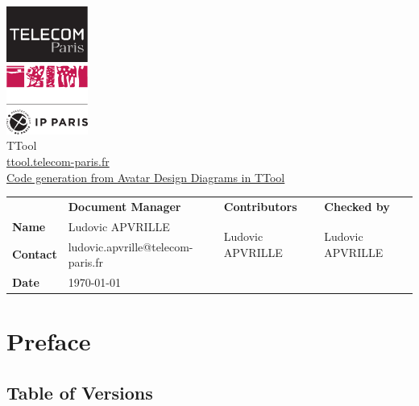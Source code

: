 \documentclass[12pt]{article}
\begin{document}
\sloppy 

\begin{center}

\includegraphics[width=0.2\textwidth]{figures/tp}
\vspace{10 pt}\\
\Huge TTool \\
\vspace{10 pt}
\Large \url{ttool.telecom-paris.fr}
\vspace{20 pt}\\
\underline{\Large Code generation from Avatar Design Diagrams in TTool}
\vspace{30 pt}
\end{center}

\begin{table}[H]
\large
\centering
\begin{adjustbox}{width=\textwidth}
\begin{tabular}{ |p{1.6cm}|p{6.0cm}|p{4.2cm}|p{4.2cm}| }
\hhline{----}
 & \textbf{Document Manager} & \textbf{Contributors}  & \textbf{Checked by}  \\ 
\hhline{----}
\textbf{Name}   & Ludovic APVRILLE & \multirow{2}{*}{Ludovic APVRILLE} &
\multirow{2}{*}{Ludovic APVRILLE} \\
\hhline{--~~}
\textbf{Contact} & ludovic.apvrille@telecom-paris.fr &  &  \\ 
\hhline{--~~}
\textbf{Date} & \today &  &  \\ 
\hline
\end{tabular}
\end{adjustbox}
\end{table}

\newpage
\tableofcontents


\newpage
\section{Preface}

\subsection{Table of Versions}
\end{document}
